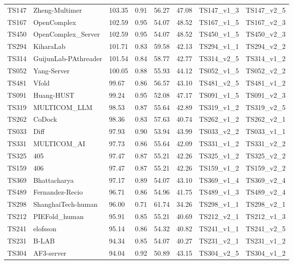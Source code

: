 \begin{longtable}{llllllll}
TS147 & Zheng-Multimer & 103.35 & 0.91 & 56.27 & 47.08 & TS147\_v1\_3 & TS147\_v2\_5 \\ 
TS167 & OpenComplex & 102.59 & 0.95 & 54.07 & 48.52 & TS167\_v1\_5 & TS167\_v2\_3 \\ 
TS450 & OpenComplex\_Server & 102.59 & 0.95 & 54.07 & 48.52 & TS450\_v1\_5 & TS450\_v2\_3 \\ 
TS294 & KiharaLab & 101.71 & 0.83 & 59.58 & 42.13 & TS294\_v1\_1 & TS294\_v2\_2 \\ 
TS314 & GuijunLab-PAthreader & 101.54 & 0.84 & 58.77 & 42.77 & TS314\_v2\_5 & TS314\_v1\_2 \\ 
TS052 & Yang-Server & 100.05 & 0.88 & 55.93 & 44.12 & TS052\_v1\_5 & TS052\_v2\_2 \\ 
TS481 & Vfold & 99.67 & 0.86 & 56.57 & 43.10 & TS481\_v2\_5 & TS481\_v1\_2 \\ 
TS091 & Huang-HUST & 99.24 & 0.95 & 52.08 & 47.17 & TS091\_v1\_5 & TS091\_v2\_3 \\ 
TS319 & MULTICOM\_LLM & 98.53 & 0.87 & 55.64 & 42.89 & TS319\_v1\_2 & TS319\_v2\_5 \\ 
TS262 & CoDock & 98.36 & 0.83 & 57.63 & 40.74 & TS262\_v1\_2 & TS262\_v2\_1 \\ 
TS033 & Diff & 97.93 & 0.90 & 53.94 & 43.99 & TS033\_v2\_2 & TS033\_v1\_1 \\ 
TS331 & MULTICOM\_AI & 97.73 & 0.86 & 55.64 & 42.09 & TS331\_v1\_2 & TS331\_v2\_2 \\ 
TS325 & 405 & 97.47 & 0.87 & 55.21 & 42.26 & TS325\_v1\_2 & TS325\_v2\_2 \\ 
TS159 & 406 & 97.47 & 0.87 & 55.21 & 42.26 & TS159\_v1\_2 & TS159\_v2\_2 \\ 
TS369 & Bhattacharya & 97.17 & 0.89 & 54.07 & 43.10 & TS369\_v1\_4 & TS369\_v2\_4 \\ 
TS489 & Fernandez-Recio & 96.71 & 0.86 & 54.96 & 41.75 & TS489\_v1\_3 & TS489\_v2\_4 \\ 
TS298 & ShanghaiTech-human & 96.00 & 0.71 & 61.74 & 34.26 & TS298\_v1\_1 & TS298\_v2\_1 \\ 
TS212 & PIEFold\_human & 95.91 & 0.85 & 55.21 & 40.69 & TS212\_v2\_1 & TS212\_v1\_3 \\ 
TS241 & elofsson & 95.14 & 0.86 & 54.32 & 40.82 & TS241\_v1\_1 & TS241\_v2\_5 \\ 
TS231 & B-LAB & 94.34 & 0.85 & 54.07 & 40.27 & TS231\_v2\_1 & TS231\_v1\_2 \\ 
TS304 & AF3-server & 94.04 & 0.92 & 50.89 & 43.15 & TS304\_v2\_5 & TS304\_v1\_2 \\ 

\end{longtable}
